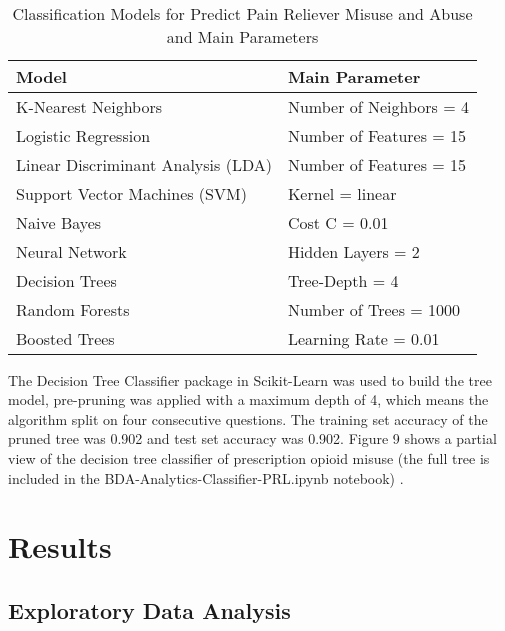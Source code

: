 \\\documentclass[sigconf]{acmart}
\begin{document}

\begin{table}
  \caption{Classification Models for Predict Pain Reliever Misuse 
  and Abuse and Main Parameters}
  \label{tab:freq}
  \begin{tabular}{ll}
    \toprule
    Model & Main Parameter \\
    \midrule
    K-Nearest Neighbors & Number of Neighbors = 4 \\
    Logistic Regression & Number of Features = 15 \\
    Linear Discriminant Analysis (LDA) & Number of Features = 15 \\
    Support Vector Machines (SVM) & Kernel = linear \\
    Naive Bayes & Cost C = 0.01 \\
    Neural Network & Hidden Layers = 2 \\
    Decision Trees & Tree-Depth = 4 \\ 
    Random Forests & Number of Trees = 1000 \\
    Boosted Trees & Learning Rate = 0.01 \\ 
    \bottomrule
  \end{tabular}
\end{table}


The Decision Tree Classifier package in Scikit-Learn was used to build the 
tree model, pre-pruning was applied with a maximum depth of 4, which means 
the algorithm split on four consecutive questions. The training set accuracy 
of the pruned tree was 0.902 and test set accuracy was 0.902. Figure 9 shows 
a partial view of the decision tree classifier of prescription opioid misuse
(the full tree is included in the BDA-Analytics-Classifier-PRL.ipynb 
notebook) \cite{classifyPRL}. 

\section{Results}

\subsection{Exploratory Data Analysis}
\end{document}
